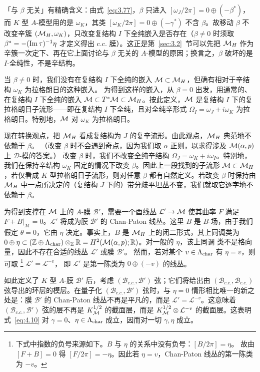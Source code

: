 \begin{yizhu}[易错点]
「与 $\beta$ 无关」有精确含义：由式~\eqref{eq:3.77}，$\beta$ 只进入 $[\omega_J/2\pi]=0\oplus(-\beta^*)$，而 $K$ 型 $A$-模型用的是 $\omega_K$，其类 $[\omega_K/2\pi]=0\oplus(-\gamma^*)$ 不含 $\beta$。故移动 $\beta$ 不改变辛簇 $({{\mathcal{M}}_H},\omega_K)$，只改变复结构 $I$ 下全纯嵌入是否存在（$\beta\ne0$ 时须取 $\beta^*=-({\rm Im}\,\tau)^{-1}\eta$ 才定义得出 c.c. 膜）。这正是第~\ref{sec:3.2}~节可以先把 ${{\mathcal{M}}_H}$ 作为辛簇一次定下、再在它上面讨论与 $\beta$ 无关的 $A$-模型的原因；换言之，$\beta$ 破坏的是 $I$-全纯性，不是辛结构。
\end{yizhu}

当 $\beta\not=0$ 时，我们没有在复结构 $I$ 下全纯的嵌入 ${\mathcal{M}}\subset
{{\mathcal{M}}_H}$，但确有相对于辛结构 $\omega_K$ 为拉格朗日的这种嵌入。
为得到这样的嵌入，从 $\beta=0$ 出发，用通常的、在复结构 $I$ 下全纯的嵌入 ${\mathcal{M}}\subset T^*{\mathcal{M}}\subset {{\mathcal{M}}_H}$。按此定义，${\mathcal{M}}$ 是复结构 $I$ 下的复拉格朗日子流形——即在复结构 $I$ 下全纯，且对全纯辛形式 $\Omega_I=\omega_J+i\omega_K$ 为拉格朗日。特别地，${\mathcal{M}}$ 对 $\omega_K$ 为拉格朗日。

现在转换观点，把 ${{\mathcal{M}}_H}$ 看成复结构为 $J$ 的复辛流形。由此观点，${{\mathcal{M}}_H}$ 典范地不依赖于 $\beta$。
（改变 $\beta$ 时不会遇到奇点，因为我们取 $\alpha$ 正则，以求得涉及 ${\mathcal{M}}(\alpha,p)$ 上 ${\mathcal D}$-模的答案。）
改变 $\beta$ 时，我们不改变全纯辛结构
$\Omega_J=\omega_K+i\omega_I$。特别地，我们在保持辛结构 $\omega_K$ 固定的情况下改变 $\beta$。因此上一段找到的子流形 ${\mathcal{M}}\subset {{\mathcal{M}}_H}$，若仅看成 $K$ 型拉格朗日子流形，则对任意
$\beta$ 都有自然定义。若改变 $\beta$ 时保持由 ${{\mathcal{M}}_H}$ 中一点所决定的（复结构 $J$ 下的）带分歧平坦丛不变，我们就取它逐字地不依赖于 $\beta$。

为得到支撑在 ${\mathcal{M}}$ 上的 $A$-膜 ${\mathcal B}'$，需要一个酉线丛 ${\mathcal L}'\to {\mathcal{M}}$
使其曲率 $F$ 满足 $F+B|_{\mathcal M}=0$。${\mathcal L}'$ 将成为膜 ${\mathcal B}'$ 的 Chan-Paton
线丛。这里 $B$ 是 $B$-场，由于我们假定 $\theta=0$，它由 $\eta$ 决定。事实上，$B$ 是 ${{\mathcal{M}}_H}$ 上的闭二形式，其上同调类为 $0\oplus \eta\subset
({\mathbb{Z}}\oplus\Lambda_{\rm char})\otimes_{\mathbb{Z}}{\mathbb{R}}=H^2({\mathcal{M}}(\alpha,
p);{\mathbb{R}})$。对一般的 $\eta$，该上同调
类不是格向量，因此不存在合适的线丛
${\mathcal L}'$ 或膜 ${\mathcal B}'$。
然而，若对某个 $v\in \Lambda_{\rm char}$ 有 $\eta=v$，则可取
\footnote{下式中指数的负号来源如下。$B$ 与 $\eta$ 的关系中没有负号：$[B/2\pi]=\eta$。
故由 $[F+B]=0$ 得 $[F/2\pi]=-\eta$。因此若 $\eta=v$，Chan-Paton 线丛的第一陈类为 $-v$。}
${\mathcal L}'={\mathcal L}^{-v}$，
即 ${\mathcal L}'$ 是第一陈类为
$0\oplus (-v)$ 的线丛。

如此定义了 $K$ 型 $A$-膜 ${\mathcal B}'$ 后，考虑 $({\mathcal B}_{c.c.},
{\mathcal B}')$ 弦；它们将给出由 $({\mathcal B}_{c.c.},{\mathcal B}_{c.c.})$ 弦导出的环层的模层。在量子化
$({\mathcal B}_{c.c.},{\mathcal B}')$ 弦时，与 $\eta=0$ 情形相比唯一的新之处是：膜 ${\mathcal B}'$ 的 Chan-Paton
线丛不再是平凡的，而是
${\mathcal L}'={\mathcal L}^{-v}$。这意味着 $({\mathcal B}_{c.c.},{\mathcal B}')$ 弦的层不再是
$K_{\mathcal{M}}^{1/2}$ 的截面层，而是
$K_{\mathcal{M}}^{1/2}\otimes {\mathcal L}^{-v}$ 的截面层。这表明式~\eqref{eq:4.10} 对 $\gamma=0$、$\eta
\in\Lambda_{\rm char}$ 成立，因而对一切 $\gamma,\eta$ 成立。

